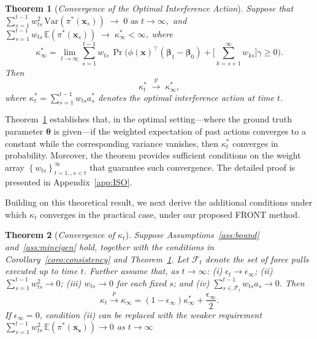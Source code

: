\documentclass[12pt]{article}
\newtheorem{theorem}{Theorem}
\begin{document}
\begin{theorem}[{\emph{Convergence of the Optimal Interference Action}}]
\label{theor:kappaast}
Suppose that   \\$
\sum_{s=1}^{t-1} w_{ts}^2 \,\text{Var}(\pi^\ast(\bm{x}_s)) \;\to\; 0 
 \text{ as } t \to \infty, $
and  
$
\sum_{s=1}^{t-1} w_{ts}\,\mathbb{E}(\pi^\ast(\bm{x}_s)) \;\to\; \kappa_\infty^\ast < \infty$, where 
\[
\kappa_\infty^\ast
= \lim_{t \to \infty} \sum_{s=1}^{t-1} w_{ts}\,
\Pr\!\Bigg(
    \phi(\bm{x})^{\top} (\bm{\beta}_1-\bm{\beta}_0)
    + \Bigg[\sum_{k=s+1}^\infty w_{ks}\Bigg]\gamma
    \ge 0 \Bigg).
\]
Then
\[
\kappa_t^\ast \;\stackrel{p}{\longrightarrow}\; \kappa_\infty^\ast,
\]
where $\kappa_t^\ast = \sum_{s=1}^{t-1} w_{ts} a_s^\ast$ denotes the optimal interference action at time $t$.
\end{theorem}

Theorem~\ref{theor:kappaast} establishes that, in the optimal setting—where the ground truth parameter $\bm{\theta}$ is given—if the weighted expectation of past actions converges to a constant while the corresponding variance vanishes, then $\kappa_t^\ast$ converges in probability. Moreover, the theorem provides sufficient conditions on the weight array $\left\{w_{ts}\right\}_{t=1,,s < t}^\infty$ that guarantee such convergence. The detailed proof is presented in Appendix~\ref{app:ISO}.

Building on this theoretical result, we next derive the additional conditions under which $\kappa_t$ converges in the practical case, under our proposed FRONT method.

\begin{theorem}[{\emph{Convergence of $\kappa_t$}}]
\label{theor:kappat}
Suppose Assumptions~\ref{ass:bound} and~\ref{ass:mineigen} hold, together with the conditions in Corollary~\ref{coro:consistency} and Theorem~\ref{theor:kappaast}. 
Let $\mathcal{F}_t$ denote the set of force pulls executed up to time $t$. 
Further assume that, as $t \to \infty$: (i) $\epsilon_t \to \epsilon_\infty$; (ii) $\sum_{s=1}^{t-1} w_{ts}^2 \to 0$; (iii) $w_{ts} \to 0$ for each fixed $s$; and (iv) $\sum_{s \in \mathcal{F}_t}^{t-1} w_{ts}a_s \to 0$. Then
\[
\kappa_t \stackrel{p}{\longrightarrow} 
\kappa_\infty 
= \left(1-\epsilon_\infty\right)\kappa_\infty^\ast + \frac{\epsilon_\infty}{2}.
\]
If $\epsilon_\infty = 0$, condition (ii) can be replaced with the weaker requirement $\sum_{s=1}^{t-1} w_{ts}^2 \,\mathbb{E}(\pi^\ast(\bm{x_s}))\to 0$ as $t \to \infty$
\end{theorem}
\end{document}
